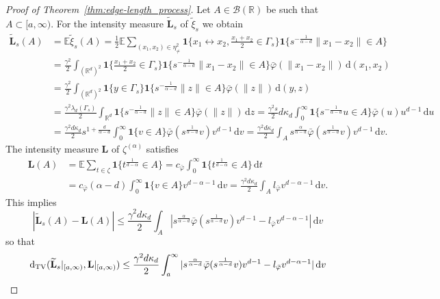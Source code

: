\documentclass{article}
\theoremstyle{definition}
\numberwithin{equation}{section}
\theoremstyle{remark}
\begin{document}
\begin{proof}[Proof of Theorem~\ref{thm:edge-length_process}]
Let $A\in\mathcal{B}(\mathbb{R})$ be such that $A\subset [a,\infty)$. For the intensity measure $\widetilde{\mathbf{L}}_s$ of $\tilde{\xi}_s$ we obtain
\begin{align*}
\widetilde{\mathbf{L}}_s(A) & = \mathbb{E} \tilde{\xi}_s(A) = \frac{1}{2} \mathbb{E} \sum_{(x_1,x_2)\in\eta_{\neq}^2} \mathbf{1}\bigg\{ x_1\leftrightarrow x_2,\frac{x_1+x_2}{2}\in\Gamma_s \bigg\} \mathbf{1}\{s^{-\frac{1}{\alpha-d}}\|x_1-x_2\| \in A\} \\
& = \frac{\gamma^2}{2} \int_{(\mathbb{R}^d)^2} \mathbf{1}\bigg\{ \frac{x_1+x_2}{2} \in \Gamma_s\bigg\} \mathbf{1}\{s^{-\frac{1}{\alpha-d}}\|x_1-x_2\|\in A\} \bar{\varphi}(\|x_1-x_2\|) \, \mathrm{d}(x_1,x_2) \\
& = \frac{\gamma^2}{2} \int_{(\mathbb{R}^d)^2} \mathbf{1}\{ y \in \Gamma_s\} \mathbf{1}\{s^{-\frac{1}{\alpha-d}}\|z\|\in A\} \bar{\varphi}(\|z\|) \, \mathrm{d}(y,z) \\
& = \frac{\gamma^2 \lambda_d(\Gamma_s)}{2} \int_{\mathbb{R}^d} \mathbf{1}\{s^{-\frac{1}{\alpha-d}}\|z\|\in A\} \bar{\varphi}(\|z\|) \, \mathrm{d}z = \frac{\gamma^2 s}{2} d\kappa_d \int_0^\infty \mathbf{1}\{s^{-\frac{1}{\alpha-d}}u\in A\} \bar{\varphi}(u) u^{d-1} \, \mathrm{d}u \\
& = \frac{\gamma^2 d\kappa_d}{2} s^{1+\frac{d}{\alpha-d}} \int_0^\infty \mathbf{1}\{v\in A\} \bar{\varphi}(s^{\frac{1}{\alpha-d}}v) v^{d-1} \, \mathrm{d}v = \frac{\gamma^2 d\kappa_d}{2} \int_A s^{\frac{\alpha}{\alpha-d}} \bar{\varphi}(s^{\frac{1}{\alpha-d}}v) v^{d-1} \, \mathrm{d}v.
\end{align*}
The intensity measure $\mathbf{L}$ of $\zeta^{(\alpha)}$ satisfies
\begin{align*}
\mathbf{L}(A) & = \mathbb{E} \sum_{t\in\zeta} \mathbf{1}\{t^{\frac{1}{d-\alpha}}\in A\} = c_{\bar{\varphi}} \int_0^\infty \mathbf{1}\{t^{\frac{1}{d-\alpha}}\in A\} \, \mathrm{d}t \\
& = c_{\bar{\varphi}} (\alpha-d) \int_0^\infty \mathbf{1}\{v\in A\} v^{d-\alpha-1} \, \mathrm{d}v = \frac{\gamma^2 d \kappa_d }{2} \int_A l_{\bar{\varphi}}v^{d-\alpha-1} \, \mathrm{d}v.
\end{align*}
This implies
$$
|\widetilde{\mathbf{L}}_s(A)-\mathbf{L}(A)| \leq  \frac{\gamma^2 d \kappa_d }{2} \int_A |s^{\frac{\alpha}{\alpha-d}} \bar{\varphi}(s^{\frac{1}{\alpha-d}}v) v^{d-1}-l_{\bar{\varphi}}v^{d-\alpha-1}| \, \mathrm{d}v
$$
so that
\begin{align*}
\mathrm{d}_{\rm TV}(\widetilde{\mathbf{L}}_s|_{[a,\infty)}, \mathbf{L}|_{[a,\infty)}) & \leq \frac{\gamma^2 d \kappa_d }{2}\int_a^\infty |s^{\frac{\alpha}{\alpha-d}} \bar{\varphi}(s^{\frac{1}{\alpha-d}}v) v^{d-1}-l_{\bar{\varphi}}v^{d-\alpha-1}| \, \mathrm{d}v \\

\end{align*}
\end{proof}
\end{document}
